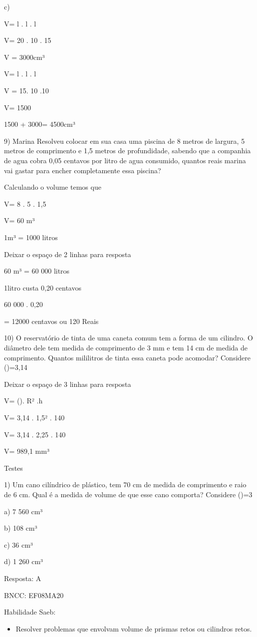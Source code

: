 c)

V= l . l . l

V= 20 . 10 . 15

V = 3000cm³

V= l . l . l

V = 15. 10 .10

V= 1500

1500 + 3000= 4500cm³

9) Marina Resolveu colocar em sua casa uma piscina de 8 metros de
largura, 5 metros de comprimento e 1,5 metros de profundidade, sabendo
que a companhia de agua cobra 0,05 centavos por litro de agua consumido,
quantos reais marina vai gastar para encher completamente essa piscina?

Calculando o volume temos que

V= 8 . 5 . 1,5

V= 60 m³

1m³ = 1000 litros

Deixar o espaço de 2 linhas para resposta

60 m³ = 60 000 litros

1litro custa 0,20 centavos

60 000 . 0,20

= 12000 centavos ou 120 Reais

10) O reservatório de tinta de uma caneta comum tem a forma de um
cilindro. O diâmetro dele tem medida de comprimento de 3 mm e tem 14 cm
de medida de comprimento. Quantos mililitros de tinta essa caneta pode
acomodar? Considere (\Pi)=3,14

Deixar o espaço de 3 linhas para resposta

V= (\Pi). R² .h

V= 3,14 . 1,5² . 140

V= 3,14 . 2,25 . 140

V= 989,1 mm³

Testes

1) Um cano cilíndrico de plástico, tem 70 cm de medida de comprimento e
raio de 6 cm. Qual é a medida de volume de que esse cano comporta?
Considere (\Pi)=3

a) 7 560 cm³

b) 108 cm³

c) 36 cm³

d) 1 260 cm³

Resposta: A

BNCC: EF08MA20

Habilidade Saeb:

\begin{itemize}
\tightlist
\item
  Resolver problemas que envolvam volume de prismas retos ou cilindros
  retos.
\end{itemize}

